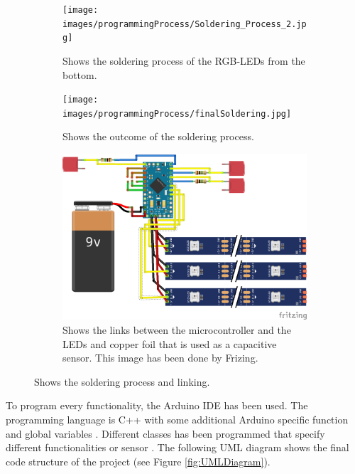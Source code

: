 \documentclass[04_projectProcess.tex]{subfiles}
\begin{document}
\begin{flushleft}
\begin{figure}[H]
\begin{subfigure}{.45\textwidth}
                \texttt{[image: images/programmingProcess/Soldering\_Process\_2.jpg]}
                \caption{Shows the soldering process of the RGB-LEDs from the bottom.}
                \label{fig:solderingProcess_2}
                \vspace{6mm}
            \end{subfigure}
            \begin{subfigure}{.45\textwidth}
                \centering
                \texttt{[image: images/programmingProcess/finalSoldering.jpg]}
                \caption{Shows the outcome of the soldering process.} 
                \label{fig:finalSoldering}
                \vspace{6mm}
            \end{subfigure}
            \begin{subfigure}{.45\textwidth}
                \centering
                \includegraphics[width=0.8\linewidth]{images/programmingProcess/sensorLinks.png}
                \caption{Shows the links between the microcontroller and the LEDs and copper foil that is 
                used as a capacitive sensor. This image has been done by Frizing. \cite{fritzing}}
                \label{fig:solderingProcess_3}
                \vspace{6mm}
            \end{subfigure}
            \caption{Shows the soldering process and linking.}
            \label{fig:solderingProcess}
        \end{figure}

        \noindent
        To program every functionality, the Arduino IDE  has been used. The programming language 
        is C++ with some additional Arduino specific function and global variables \cite{introductionArduino}. 
        Different classes has been programmed that specify different functionalities or sensor \cite{
        arduinoClasses}. The following UML diagram shows the final code structure of the project (see 
        Figure \ref{fig:UMLDiagram}).


\end{flushleft}
\end{document}
